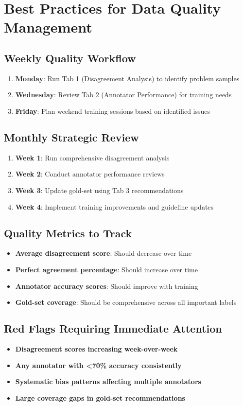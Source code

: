 \documentclass[11pt]{article}
\begin{document}
\section{Best Practices for Data Quality Management}

\subsection{Weekly Quality Workflow}
\begin{enumerate}
\item \textbf{Monday}: Run Tab 1 (Disagreement Analysis) to identify problem samples
\item \textbf{Wednesday}: Review Tab 2 (Annotator Performance) for training needs
\item \textbf{Friday}: Plan weekend training sessions based on identified issues
\end{enumerate}

\subsection{Monthly Strategic Review}
\begin{enumerate}
\item \textbf{Week 1}: Run comprehensive disagreement analysis
\item \textbf{Week 2}: Conduct annotator performance reviews
\item \textbf{Week 3}: Update gold-set using Tab 3 recommendations
\item \textbf{Week 4}: Implement training improvements and guideline updates
\end{enumerate}

\subsection{Quality Metrics to Track}
\begin{itemize}
\item \textbf{Average disagreement score}: Should decrease over time
\item \textbf{Perfect agreement percentage}: Should increase over time  
\item \textbf{Annotator accuracy scores}: Should improve with training
\item \textbf{Gold-set coverage}: Should be comprehensive across all important labels
\end{itemize}

\subsection{Red Flags Requiring Immediate Attention}
\begin{itemize}
\item \textbf{Disagreement scores increasing week-over-week}
\item \textbf{Any annotator with <70\% accuracy consistently}
\item \textbf{Systematic bias patterns affecting multiple annotators}
\item \textbf{Large coverage gaps in gold-set recommendations}
\end{itemize}
\end{document}
